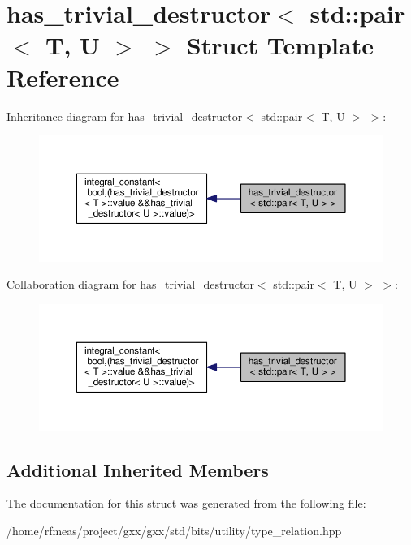 \hypertarget{structhas__trivial__destructor_3_01std_1_1pair_3_01T_00_01U_01_4_01_4}{}\section{has\+\_\+trivial\+\_\+destructor$<$ std\+:\+:pair$<$ T, U $>$ $>$ Struct Template Reference}
\label{structhas__trivial__destructor_3_01std_1_1pair_3_01T_00_01U_01_4_01_4}


Inheritance diagram for has\+\_\+trivial\+\_\+destructor$<$ std\+:\+:pair$<$ T, U $>$ $>$\+:
\nopagebreak
\begin{figure}[H]
\begin{center}
\leavevmode
\includegraphics[width=350pt]{structhas__trivial__destructor_3_01std_1_1pair_3_01T_00_01U_01_4_01_4__inherit__graph}
\end{center}
\end{figure}


Collaboration diagram for has\+\_\+trivial\+\_\+destructor$<$ std\+:\+:pair$<$ T, U $>$ $>$\+:
\nopagebreak
\begin{figure}[H]
\begin{center}
\leavevmode
\includegraphics[width=350pt]{structhas__trivial__destructor_3_01std_1_1pair_3_01T_00_01U_01_4_01_4__coll__graph}
\end{center}
\end{figure}
\subsection*{Additional Inherited Members}


The documentation for this struct was generated from the following file\+:\begin{DoxyCompactItemize}
\item 
/home/rfmeas/project/gxx/gxx/std/bits/utility/type\+\_\+relation.\+hpp\end{DoxyCompactItemize}
